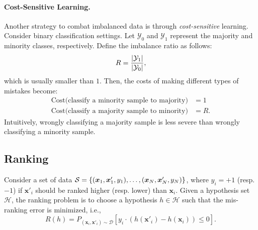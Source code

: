 {    \paragraph{Cost-Sensitive Learning.}
    Another strategy to combat imbalanced data is through \emph{cost-sensitive} learning.
    Consider binary classification settings.
    Let $\mathcal{Y}_0$ and $\mathcal{Y}_1$ represent the majority and minority classes, respectively. 
    Define the imbalance ratio as follows:
        \begin{equation}
            R = \frac{| \mathcal{Y}_1 |}{| \mathcal{Y}_0 |},
        \end{equation}
    which is usually smaller than $1$. 
    Then, the costs of making different types of mistakes become:
        \begin{equation}
            \begin{aligned}
                    \text{Cost(classify a minority sample to majority)} & = 1 \\
                    \text{Cost(classify a majority sample to minority)} & = R.
            \end{aligned}
        \end{equation}
    Intuitively, wrongly classifying a majority sample is less severe than wrongly classifying a minority sample.
        

\subsection{Ranking}
    Consider a set of data $\mathcal{S}=\{ (\bm{x}_1, \bm{x}'_1, y_1), \ldots, (\bm{x}_{N}, \bm{x}'_{N}, y_{N}) \}$, where $y_i=+1$ (resp. $-1$) if $\bm{x}'_i$ should be ranked higher (resp. lower) than $\bm{x}_i$.
    Given a hypothesis set $\mathcal{H}$, the ranking problem is to choose a hypothesis $h \in \mathcal{H}$ such that the mis-ranking error is minimized, i.e.,
        \begin{equation}
            R(h) = P_{(\bm{x}_i, \bm{x}'_i) \sim \mathcal{D}}\left[ y_i \cdot \left( h(\bm{x}'_i) - h(\bm{x}_i) \right) \le 0 \right].
        \end{equation}
    
}
